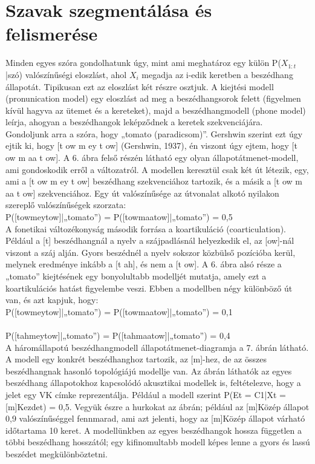 \documentclass[a4paper,12pt]{paper}
\begin{document}
\section{Szavak szegmentálása és felismerése}
Minden egyes szóra gondolhatunk úgy, mint ami meghatároz egy külön P($X_{1:t}$|szó) valószínűségi eloszlást, ahol $X_{i}$ megadja az i-edik keretben a beszédhang állapotát. Tipikusan ezt az eloszlást két részre osztjuk. A kiejtési modell (pronunication model) egy eloszlást ad meg a beszédhangsorok felett (figyelmen kívül hagyva az ütemet és a kereteket), majd a beszédhangmodell (phone model) leírja, ahogyan a beszédhangok leképződnek a keretek szekvenciájára.
\\Gondoljunk arra a szóra, hogy „tomato (paradicsom)”. Gershwin szerint ezt úgy ejtik ki, hogy [t ow m ey t ow] (Gershwin, 1937), én viszont úgy ejtem, hogy [t ow m aa t ow]. A 6. ábra felső részén látható egy olyan állapotátmenet-modell, ami gondoskodik erről a változatról. A modellen keresztül csak két út létezik, egy, ami a [t ow m ey t ow] beszédhang szekvenciához tartozik, és a másik a [t ow m aa t ow] szekvenciához. Egy út valószínűsége az útvonalat alkotó nyilakon szereplő valószínűségek szorzata:
\\ P([towmeytow]|„tomato”) = P([towmaatow]|„tomato”) = 0,5 
\\A fonetikai változékonyság második forrása a koartikuláció (coarticulation). Például a [t] beszédhangnál a nyelv a szájpadlásnál helyezkedik el, az [ow]-nál viszont a száj alján. Gyors beszédnél a nyelv sokszor közbülső pozícióba kerül, melynek eredménye inkább a [t ah], és nem a [t ow]. A 6. ábra alsó része a „tomato” kiejtésének egy bonyolultabb modelljét mutatja, amely ezt a koartikulációs hatást figyelembe veszi. Ebben a modellben négy különböző út van, és azt kapjuk, hogy:
\\P([towmeytow]|„tomato”) = P([towmaatow]|„tomato”) = 0,1
\\
\\P([tahmeytow]|„tomato”) = P([tahmaatow]|„tomato”) = 0,4 
\\A háromállapotú beszédhangmodell állapotátmenet-diagramja a 7. ábrán látható. A modell egy konkrét beszédhanghoz tartozik, az [m]-hez, de az összes beszédhangnak hasonló topológiájú modellje van. Az ábrán láthatók az egyes beszédhang állapotokhoz kapcsolódó akusztikai modellek is, feltételezve, hogy a jelet egy VK címke reprezentálja. Például a modell szerint P(Et = C1|Xt = [m]Kezdet) = 0,5. Vegyük észre a hurkokat az ábrán; például az [m]Közép állapot 0,9 valószínűséggel fennmarad, ami azt jelenti, hogy az [m]Közép állapot várható időtartama 10 keret. A modellünkben az egyes beszédhangok hossza független a többi beszédhang hosszától; egy kifinomultabb modell képes lenne a gyors és lassú beszédet megkülönböztetni.
\end{document}
